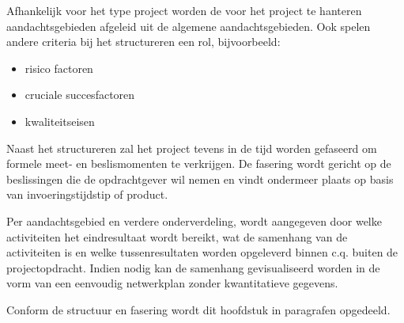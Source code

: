Afhankelijk voor het type project worden de voor het project te hanteren aandachtsgebieden afgeleid uit de algemene aandachtsgebieden.
Ook spelen andere criteria bij het structureren een rol, bijvoorbeeld:

\begin{itemize}
  \item risico factoren
  \item cruciale succesfactoren
  \item kwaliteitseisen
\end{itemize}

Naast het structureren zal het project tevens in de tijd worden gefaseerd om formele meet- en beslismomenten te verkrijgen.
De fasering wordt gericht op de beslissingen die de opdrachtgever wil nemen
en vindt ondermeer plaats op basis van invoeringstijdstip of product.

Per aandachtsgebied en verdere onderverdeling, wordt aangegeven door welke activiteiten het eindresultaat wordt bereikt,
wat de samenhang van de activiteiten is en welke tussenresultaten worden opgeleverd binnen c.q. buiten de projectopdracht.
Indien nodig kan de samenhang gevisualiseerd worden in de vorm van een eenvoudig netwerkplan zonder kwantitatieve gegevens.

Conform de structuur en fasering wordt dit hoofdstuk in paragrafen opgedeeld.


